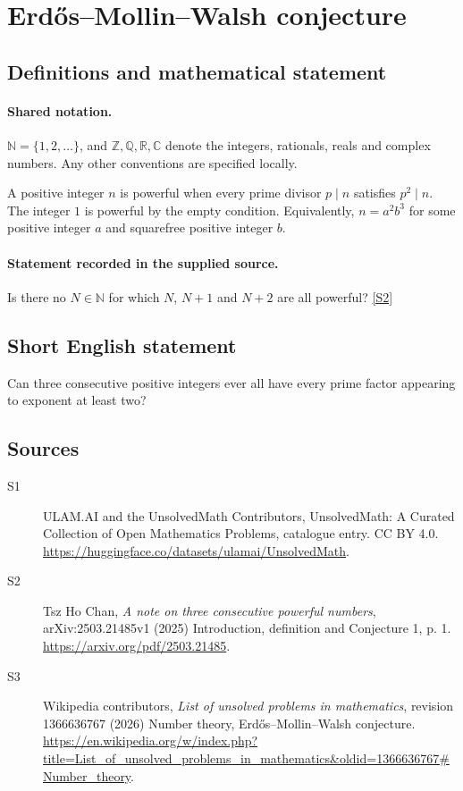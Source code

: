 \documentclass[11pt]{article}
\newcommand{\sref}[2]{\hyperlink{source:#1:#2}{[S#2]}}
\begin{document}
\section{Erdős–Mollin–Walsh conjecture}\label{statement}

\subsection{Definitions and mathematical statement}

\paragraph{Shared notation.}$\mathbb N=\{1,2,\ldots\}$, and $\mathbb Z,\mathbb Q,\mathbb R,\mathbb C$ denote the integers, rationals, reals and complex numbers. Any other conventions are specified locally.


A positive integer $n$ is powerful when every prime divisor $p\mid n$ satisfies $p^2\mid n$. The integer $1$ is powerful by the empty condition. Equivalently, $n=a^2b^3$ for some positive integer $a$ and squarefree positive integer $b$.
\paragraph{Statement recorded in the supplied source.}
Is there no $N\in\mathbb N$ for which $N$, $N+1$ and $N+2$ are all powerful? \sref{statement}{2}
\subsection{Short English statement}
Can three consecutive positive integers ever all have every prime factor appearing to exponent at least two?
\subsection{Sources}
\begin{description}
\item[\hypertarget{source:statement:1}{S1}] ULAM.AI and the UnsolvedMath Contributors, UnsolvedMath: A Curated Collection of Open Mathematics Problems, catalogue entry. CC BY 4.0. \url{https://huggingface.co/datasets/ulamai/UnsolvedMath}.
\item[\hypertarget{source:statement:2}{S2}] Tsz Ho Chan, \emph{A note on three consecutive powerful numbers}, arXiv:2503.21485v1 (2025) Introduction, definition and Conjecture 1, p. 1. \url{https://arxiv.org/pdf/2503.21485}.
\item[\hypertarget{source:statement:3}{S3}] Wikipedia contributors, \emph{List of unsolved problems in mathematics}, revision 1366636767 (2026) Number theory, Erdős–Mollin–Walsh conjecture. \url{https://en.wikipedia.org/w/index.php?title=List_of_unsolved_problems_in_mathematics&oldid=1366636767#Number_theory}.
\end{description}
\label{end:statement}
\end{document}
